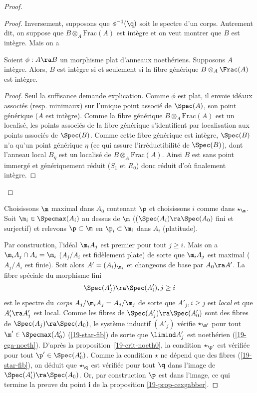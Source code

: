 \documentclass[10pt]{../fichiers-configuration-latex/smfart}
\begin{document}
\begin{proof}
\begin{proof}
Inversement, supposons que $\phi^{-1}(\q)$ soit le spectre d'un corps. Autrement dit,  on suppose
que $B\otimes_A\text{Frac}(A)$ est intègre et on veut montrer que $B$ est intègre. Mais on a
\begin{sslemme} Soient $\phi : A\ra B$ un morphisme plat d'anneaux noethériens. Supposons $A$
intègre. Alors, $B$ est intègre si et seulement si la fibre générique $B\otimes_A\Frac(A)$ est
intègre.\end{sslemme} \begin{proof} Seul la suffisance demande explication.  Comme $\phi$ est plat,
il envoie idéaux associés (resp. minimaux) sur l'unique point associé de $\Spec(A)$, son point
générique ($A$ est intègre). Comme la fibre générique $B\otimes_A\text{Frac}(A)$ est un localisé,
les points associés de la fibre générique s'identifient par localisation aux points associés de
$\Spec(B)$. Comme cette fibre générique  est intègre, $\Spec(B)$ n'a qu'un point générique $\eta$
(ce qui assure l'irréductibilité de $\Spec(B)$), dont l'anneau local $B_\eta$ est un localisé de
$B\otimes_A\text{Frac}(A)$. Ainsi $B$ est sans point immergé et génériquement réduit ($S_1$ et
$R_0$) donc réduit d'où finalement intègre.  \end{proof} \end{proof} \medskip

Choisissons $\m$ maximal dans $A_0$ contenant $\p$ et choisissons $i$ comme dans $\star_\m$. Soit
$\m_i\in\Specmax(A_i)$ au dessus de $\m$ (($\Spec(A_i)\ra\Spec(A_0)$ fini et surjectif) et relevons
$\p\subset\m$ en $\p_i\subset\m_i$ dans $A_i$ (platitude).

Par construction, l'idéal $\m_iA_j$ est premier pour tout $j\geq i$. Mais on a $\m_iA_j\cap
A_i=\m_i$ ($A_j/A_i$ est fidèlement plate) de sorte que $\m_iA_j$ est maximal ($A_j/A_i$ est finie).
Soit alors $A'=(A_i)_{\m_i}$ et changeons de base par $A_0\ra A'$. La fibre spéciale du morphisme
fini $$\Spec(A'_j)\ra\Spec(A'_i),j\geq i$$ est le spectre du \emph{corps} $A_j/\m_iA_j=A_j/\m_j$ de
sorte que $A'_j,i\geq j$ est \emph{local} et que $A'_i\ra A'_j$ est local. Comme les fibres de
$\Spec(A'_j)\ra \Spec(A'_0)$ sont des fibres de $\Spec(A_j)\ra\Spec(A_0)$, le système inductif
$(A'_j)$ vérifie $\star_{\m'}$ pour tout $\m'\in\Specmax(A'_0)$ (\ref{19-star-fib}) de sorte que
$\limind A'_j$ est noethérien (\ref{19-ega-noeth}). D'après la proposition~\ref{19-crit-noeth0}, la
condition $\star_{\p'}$ est vérifiée pour tout $\p'\in\Spec(A'_0)$. Comme la condition $\star$ ne
dépend que des fibres (\ref{19-star-fib}), on déduit que $\star_{\q}$ est vérifiée pour tout $\q$
dans l'image de $\Spec(A'_i)\ra\Spec(A_0)$. Or, par construction $\p$ est dans l'image, ce qui
termine la preuve du point \textbf{i} de la proposition \ref{19-prop-cexgabber}.\end{proof} \medskip
\end{document}
